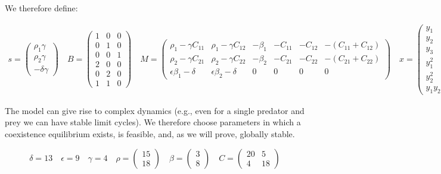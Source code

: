 \documentclass{article}
\begin{document}
We therefore define:

\begin{equation}
\begin{aligned}
s = \begin{pmatrix}
\rho_1 \gamma \\
\rho_2 \gamma \\
-\delta \gamma
\end{pmatrix}
\quad 
B = \begin{pmatrix}
1 & 0 & 0 \\
0 & 1 & 0 \\
0 & 0 & 1 \\
2 & 0 & 0 \\
0 & 2 & 0 \\
1 & 1 & 0 
\end{pmatrix}
\quad 
M = \begin{pmatrix}
\rho_1 - \gamma C_{11} & \rho_1 - \gamma C_{12} & -\beta_1 & -C_{11} & -C_{12} & - (C_{11} + C_{12})\\
\rho_2 - \gamma C_{21} & \rho_2 - \gamma C_{22} & -\beta_2 & -C_{21} & -C_{22} & - (C_{21} + C_{22})\\
\epsilon  \beta_1 - \delta & \epsilon  \beta_2 - \delta & 0 & 0 & 0 & 0
\end{pmatrix}\quad
x = \begin{pmatrix}
y_1\\
y_2\\
y_3\\
y_1^2\\
y_2^2 \\
y_1 y_2
\end{pmatrix}
\end{aligned}
\end{equation}

The model can give rise to complex dynamics (e.g., even for a single
predator and prey we can have stable limit cycles). We therefore choose
parameters in which a coexistence equilibrium exists, is feasible, and,
as we will prove, globally stable.

\begin{equation}
\delta = 13 \quad \epsilon = 9 \quad \gamma = 4 \quad
\rho = \begin{pmatrix} 15\\18 \end{pmatrix} \quad
\beta = \begin{pmatrix} 3\\8 \end{pmatrix} 
\quad
C = \begin{pmatrix} 20 & 5\\4 & 18\end{pmatrix}
\end{equation}
\end{document}
